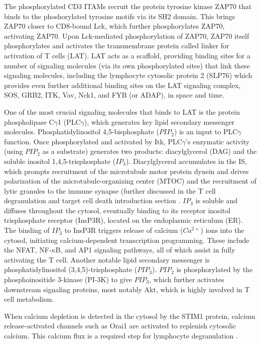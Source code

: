 The phosphorylated CD3 ITAMs recruit the protein tyrosine kinase ZAP70 that binds to the phoshorylated tyrosine motifs via its SH2 domain.  This brings ZAP70 closer to CD8-bound Lck, which further phosphorylates ZAP70, activating ZAP70. Upon Lck-mediated phosphorylation of ZAP70,  ZAP70 itself phosphorylates and activates the transmembrane protein called linker for activation of T cells (LAT). LAT acts as a scaffold, providing binding sites for a number of signaling molecules (via its own phosphorylated sites) that link these signaling molecules, including the lymphocyte cytosolic protein 2 (SLP76) which provides even further additional binding sites on the LAT signaling complex, SOS,  GRB2, ITK, Vav, Nck1, and FYB (or ADAP), in space and time.  

One of the most crucial signaling molecules that binds to LAT is the protein phospholipase C$\gamma$1 (PLC$\gamma$), which generates key lipid secondary messenger molecules. Phosphatidylinositol 4,5-bisphosphate ($PIP_{2}$) is an input to PLC$\gamma$ function. Once phosphorylated and activated by Itk, PLC$\gamma$'s enzymatic activity (using $PIP_{2}$ as a substrate) generates two products: diacylglycerol (DAG) and the soluble inositol 1,4,5-trisphosphate ($IP_{3}$). Diacylglycerol accumulates in the IS, which prompts recruitment of the microtubule motor protein dynein and drives polarization of the microtubule-organizing center (MTOC) \cite{Quann2009} and the recruitment of lytic granules to the immune synapse (further discussed in the T cell degranulation and target cell death introduction section \cite{Stinchcombe2006}. $IP_{3}$ is soluble and diffuses throughout the cytosol, eventually binding to its receptor inositol trisphosphate receptor (InsP3R), located on the endoplasmic reticulum (ER). The binding of $IP_{3}$ to InsP3R triggers release of calcium ($Ca^{2+}$) ions into the cytosol, initiating calcium-dependent transcription programming. These include the NFAT, NF-$\kappa$B, and AP1 signaling pathways, all of which assist in fully activating the T cell. Another notable lipid secondary messenger is phosphatidylinositol (3,4,5)-trisphosphate ($PIP_{3}$). $PIP_{2}$ is phosphorylated by the phosphoinositide 3-kinase (PI-3K) to give $PIP_{3}$, which further activates downstream signaling proteins, most notably Akt, which is highly involved in T cell metabolism.

When calcium depletion is detected in the cytosol by the STIM1 protein, calcium release-activated channels such as Orai1 are activated to replenish cytosolic calcium.  This calcium flux is a required step for lymphocyte degranulation \cite{Maul-Pavicic2011}. 

